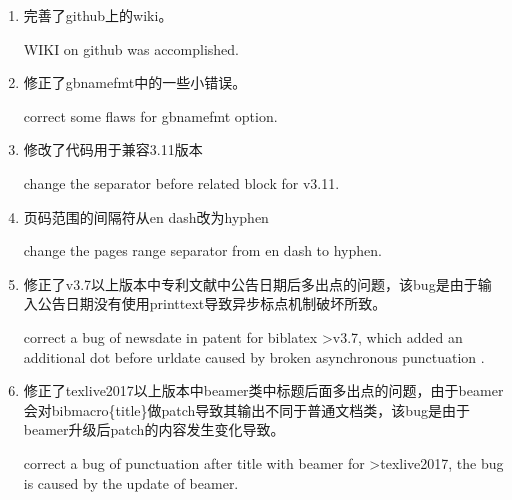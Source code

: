 \begin{enumerate}
\item 完善了github上的wiki。

WIKI on github was accomplished.

\item 修正了gbnamefmt中的一些小错误。

correct some flaws for gbnamefmt option.

\item 修改了代码用于兼容3.11版本

change the separator before related block for v3.11.

\item 页码范围的间隔符从en dash改为hyphen

change the pages range separator from en dash to hyphen.
	
\item 修正了v3.7以上版本中专利文献中公告日期后多出点的问题，该bug是由于输入公告日期没有使用printtext导致异步标点机制破坏所致。

correct a bug of newsdate in patent for biblatex >v3.7, which added an additional dot before urldate caused by broken asynchronous punctuation .

\item 修正了texlive2017以上版本中beamer类中标题后面多出点的问题，由于beamer会对bibmacro\{title\}做patch导致其输出不同于普通文档类，该bug是由于beamer升级后patch的内容发生变化导致。

correct a bug of punctuation after title with beamer for >texlive2017, the bug is caused by the update of beamer.
\end{enumerate}

